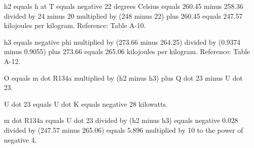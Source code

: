 h2 equals h at T equals negative 22 degrees Celsius equals 260.45 minus 258.36 divided by 24 minus 20 multiplied by (248 minus 22) plus 260.45 equals 247.57 kilojoules per kilogram.  
Reference: Table A-10.

h3 equals negative phi multiplied by (273.66 minus 264.25) divided by (0.9374 minus 0.9055) plus 273.66 equals 265.06 kilojoules per kilogram.  
Reference: Table A-12.

O equals m dot R134a multiplied by (h2 minus h3) plus Q dot 23 minus U dot 23.

U dot 23 equals U dot K equals negative 28 kilowatts.

m dot R134a equals U dot 23 divided by (h2 minus h3) equals negative 0.028 divided by (247.57 minus 265.06) equals 5.896 multiplied by 10 to the power of negative 4.